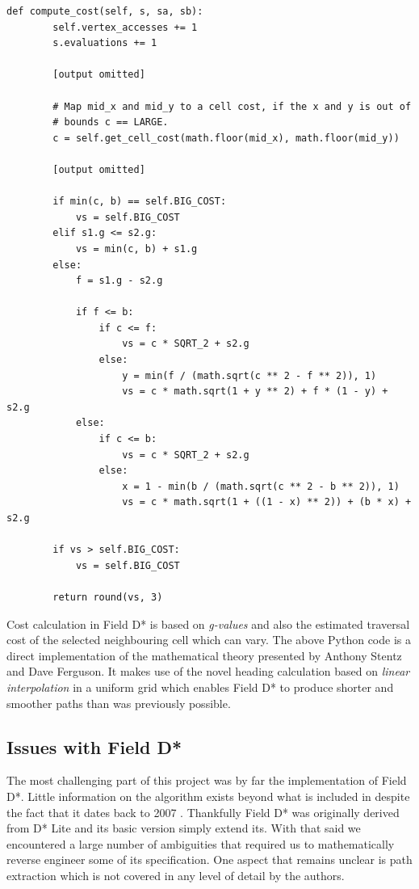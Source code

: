 \begin{lstlisting}
def compute_cost(self, s, sa, sb):
        self.vertex_accesses += 1
        s.evaluations += 1

        [output omitted]

        # Map mid_x and mid_y to a cell cost, if the x and y is out of
        # bounds c == LARGE.
        c = self.get_cell_cost(math.floor(mid_x), math.floor(mid_y))

		[output omitted]

        if min(c, b) == self.BIG_COST:
            vs = self.BIG_COST
        elif s1.g <= s2.g:
            vs = min(c, b) + s1.g
        else:
            f = s1.g - s2.g

            if f <= b:
                if c <= f:
                    vs = c * SQRT_2 + s2.g
                else:
                    y = min(f / (math.sqrt(c ** 2 - f ** 2)), 1)
                    vs = c * math.sqrt(1 + y ** 2) + f * (1 - y) + s2.g
            else:
                if c <= b:
                    vs = c * SQRT_2 + s2.g
                else:
                    x = 1 - min(b / (math.sqrt(c ** 2 - b ** 2)), 1)
                    vs = c * math.sqrt(1 + ((1 - x) ** 2)) + (b * x) + s2.g

        if vs > self.BIG_COST:
            vs = self.BIG_COST

        return round(vs, 3)
\end{lstlisting}

\noindent
Cost calculation in Field D* is based on \textit{g-values} and also the estimated traversal cost of the selected neighbouring cell which can vary. The above Python code is a direct implementation of the mathematical theory presented by Anthony Stentz and Dave Ferguson. It makes use of the novel heading calculation based on \textit{linear interpolation} in a uniform grid which enables Field D* to produce shorter and smoother paths than was previously possible.

\subsection{Issues with Field D*}
\noindent
The most challenging part of this project was by far the implementation of Field D*. Little information on the algorithm exists beyond what is included in \cite{FIELD, FIELD2} despite the fact that it dates back to 2007 \cite{FIELD}. Thankfully Field D* was originally derived from D* Lite \cite{D*LITE} and its basic version simply extend its. With that said we encountered a large number of ambiguities that required us to mathematically reverse engineer some of its specification. One aspect that remains unclear is path extraction which is not covered in any level of detail by the authors. \\

